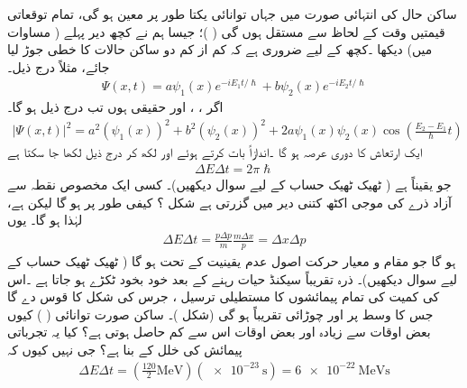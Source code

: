  ساکن حال کی انتہائی صورت میں جہاں توانائی یکتا طور پر معین ہو گی،  تمام توقعاتی قیمتیں وقت کے لحاظ سے مستقل ہوں گی ( )؛  جیسا ہم نے کچھ دیر پہلے ( مساوات  میں) دیکھا ۔کچھ  کے لیے ضروری ہے کہ کم از کم دو ساکن حالات کا خطی جوڑ لیا جائے، مثلاً درج ذیل۔ 
\begin{align*}
\Psi (x,t) = a\psi_{1}(x)e^{-iE_{1}t/\hslash} + b\psi_{2}(x)e^{-iE_{2}t/\hslash}
\end{align*}
اگر   ، ،   اور حقیقی  ہوں تب درج ذیل ہو گا۔
\begin{align*}
| \Psi(x,t)|^{2} = a^{2}(\psi_{1}(x))^{2} + b^{2}(\psi_{2}(x))^{2} + 2a\psi_{1}(x)\psi_{2}(x)\cos \left( \frac{E_{2}-E_{1}}{\hslash} t \right)
\end{align*}
ایک ارتعاش کا دوری عرصہ  ہو گا ۔اندازاً بات کرتے ہوئے  اور  لکھ کر درج ذیل لکھا جا  سکتا ہے
\begin{align*}
\Delta E \Delta t = 2\pi\hslash
\end{align*}
جو یقیناً   ہے ( ٹھیک ٹھیک حساب کے لیے  سوال   دیکھیں)۔
 کسی ایک مخصوص نقطہ سے آزاد ذرے کی موجی اکٹھ کتنی دیر میں گزرتی  ہے شکل ؟ کیفی طور پر  ہو گا لیکن  ہے،  لہٰذا  ہو گا۔ یوں 
\begin{align*}
\Delta E \Delta t = \frac{p\Delta p}{m} \frac{m\Delta x}{p} = \Delta x \Delta p
\end{align*}
ہو گا جو مقام و معیار حرکت اصول  عدم یقینیت کے  تحت  ہو گا (  ٹھیک ٹھیک حساب کے لیے سوال    دیکھیں)۔
 ذرہ  تقریباً  سیکنڈ  حیات رہنے کے بعد خود بخود ٹکڑے ہو جاتا ہے ۔اس کی کمیت کی تمام پیمائشوں کا مستطیلی ترسیل ، جرس  کی شکل کا قوس دے گا جس کا وسط  پر اور  چوڑائی تقریباً  ہو گی (شکل )۔ ساکن صورت توانائی ( )  کیوں بعض اوقات  سے زیادہ اور بعض اوقات اس سے کم حاصل ہوتی ہے؟ کیا یہ تجرباتی پیمائش کی خلل کے بنا ہے؟ جی نہیں کیوں کہ 
\begin{align*}
\Delta E \Delta t = \left( \frac{120}{2} \si{\mega\electronvolt} \right)  ( \SI{e-23}{\second}) = \SI{6e-22}{\mega\electronvolt\second}
\end{align*}
